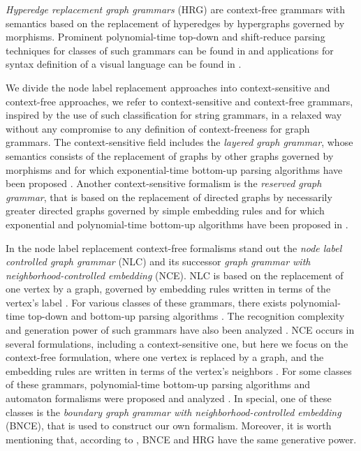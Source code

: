 \documentclass[]{report}
\begin{document}
\textit{Hyperedge replacement graph grammars} (HRG) are context-free grammars with semantics based on the replacement of hyperedges by hypergraphs \cite{drewes1997hyperedge} governed by morphisms. Prominent polynomial-time top-down and shift-reduce parsing techniques for classes of such grammars can be found in \cite{drewes2015predictive,drewes2017predictive,bjorklund2016between,chiang2013parsing} and applications for syntax definition of a visual language can be found in \cite{minas2006syntax,engelfriet1998tree}.

We divide the node label replacement approaches into context-sensitive and context-free approaches, we refer to context-sensitive and context-free grammars, inspired by the use of such classification for string grammars, in a relaxed way without any compromise to any definition of context-freeness for graph grammars. The context-sensitive field includes the \textit{layered graph grammar}, whose semantics consists of the replacement of graphs by other graphs governed by morphisms \cite{rekers1997defining} and for which exponential-time bottom-up parsing algorithms have been proposed \cite{rekers1995graph,bottoni2000efficient,furst2011improving}. Another context-sensitive formalism is the \textit{reserved graph grammar}, that is based on the replacement of directed graphs by necessarily greater directed graphs governed by simple embedding rules \cite{zhang2001context} and for which exponential and polynomial-time bottom-up algorithms have been proposed in \cite{zeng2005rgg+,zou2017partial}.

In the node label replacement context-free formalisms stand out the  \textit{node label controlled graph grammar} (NLC) and its successor \textit{graph grammar with neighborhood-controlled embedding} (NCE). NLC is based on the replacement of one vertex by a graph, governed by embedding rules written in terms of the vertex's label \cite{rozenberg1986boundary}. For various classes of these grammars, there exists polynomial-time top-down and bottom-up parsing algorithms \cite{flasinski1993parsing,flasinski2014characteristics, rozenberg1986boundary, wanke1991algorithms}. The recognition complexity and generation power of such grammars have also been analyzed \cite{flasinski1998power,kim2012structure}. NCE occurs in several formulations, including a context-sensitive one, but here we focus on the context-free formulation, where one vertex is replaced by a graph, and the embedding rules are written in terms of the vertex's neighbors \cite{janssens1982graph,skodinis1998neighborhood}. For some classes of these grammars, polynomial-time bottom-up parsing algorithms and automaton formalisms were proposed and analyzed \cite{kim2001efficient,brandenburg2005finite}. In special, one of these classes is the \textit{boundary graph grammar with neighborhood-controlled embedding} (BNCE), that is used to construct our own formalism. Moreover, it is worth mentioning that, according to \cite{engelfiet1990comparison}, BNCE and HRG have the same generative power.
\end{document}
